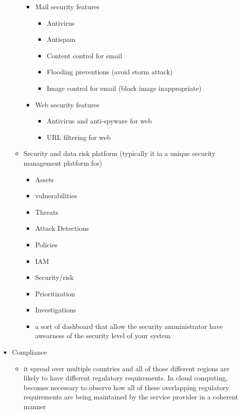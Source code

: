 \documentclass{article}
\begin{document}
\begin{itemize}
\begin{itemize}
\begin{itemize}
\begin{figure}[h]
            \end{figure}
            \item Mail security features
            \begin{itemize}
                \item Antivirus
                \item Antispam
                \item Content control for email
                \item Flooding preventions (avoid storm attack)
                \item Image control for email (block image inappropriate)
            \end{itemize}
            \item Web security features
            \begin{itemize}
                \item Antivirus and anti-spyware for web
                \item URL filtering for web
            \end{itemize}
        \end{itemize}
        \item Security and data risk platform (typically it ia a unique security management platform for)
        \begin{itemize}
            \item Assets
            \item vulnerabilities
            \item Threats
            \item Attack Detections
            \item Policies
            \item IAM
            \item Security/risk 
            \item Prioritization
            \item Investigations
            \item a sort of dashboard that allow the security amministrator have awearness of the security level of your system
        \end{itemize}
    \end{itemize}
    \item Compliance
    \begin{itemize}
        \item it spread over multiple countries and all of those different regions are likely to have different regulatory requirements. In cloud computing, becomes necessary to observe how all of these overlapping regulatory requirements are being maintained by the service provider in a coherent manner

\end{itemize}
\end{itemize}
\end{document}
